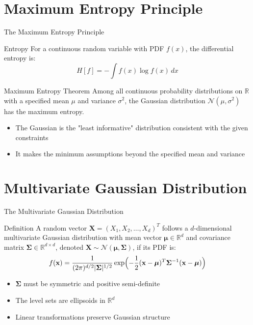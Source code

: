 \documentclass{beamer}
\begin{document}
\section{Maximum Entropy Principle}

\begin{frame}{The Maximum Entropy Principle}
  \begin{block}{Entropy}
    For a continuous random variable with PDF $f(x)$, the differential entropy is:
    \[
    H[f] = -\int f(x) \log f(x) \, dx
    \]
  \end{block}
  
  \begin{block}{Maximum Entropy Theorem}
    Among all continuous probability distributions on $\mathbb{R}$ with a specified mean $\mu$ and variance $\sigma^2$, the Gaussian distribution $\mathcal{N}(\mu, \sigma^2)$ has the maximum entropy.
  \end{block}
  
  \begin{itemize}
    \item The Gaussian is the "least informative" distribution consistent with the given constraints
    \item It makes the minimum assumptions beyond the specified mean and variance
  \end{itemize}
\end{frame}

\section{Multivariate Gaussian Distribution}

\begin{frame}{The Multivariate Gaussian Distribution}
  \begin{block}{Definition}
    A random vector $\mathbf{X} = (X_1, X_2, \ldots, X_d)^T$ follows a $d$-dimensional multivariate Gaussian distribution with mean vector $\boldsymbol{\mu} \in \mathbb{R}^d$ and covariance matrix $\boldsymbol{\Sigma} \in \mathbb{R}^{d \times d}$, denoted $\mathbf{X} \sim \mathcal{N}(\boldsymbol{\mu}, \boldsymbol{\Sigma})$, if its PDF is:
    \[
    f(\mathbf{x}) = \frac{1}{(2\pi)^{d/2}|\boldsymbol{\Sigma}|^{1/2}} \exp\Bigl(-\frac{1}{2}(\mathbf{x}-\boldsymbol{\mu})^T \boldsymbol{\Sigma}^{-1} (\mathbf{x}-\boldsymbol{\mu})\Bigr)
    \]
  \end{block}
  
  \begin{itemize}
    \item $\boldsymbol{\Sigma}$ must be symmetric and positive semi-definite
    \item The level sets are ellipsoids in $\mathbb{R}^d$
    \item Linear transformations preserve Gaussian structure
  \end{itemize}
\end{frame}
\end{document}
